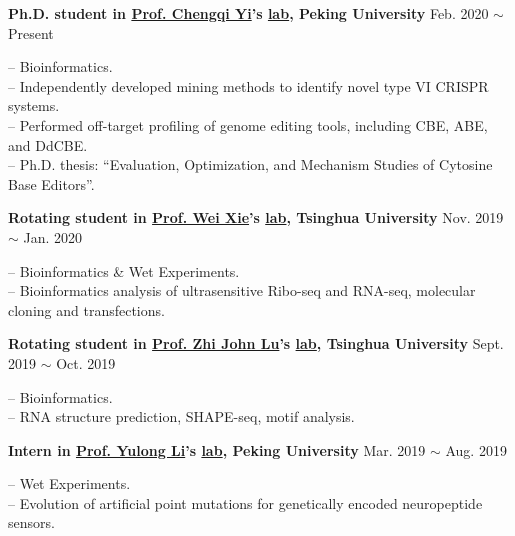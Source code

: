 \textbf{Ph.D. student in \href{https://www.bio.pku.edu.cn/enhomes/news/teacher_dis/91.html}{Prof. Chengqi Yi}'s \href{https://yilab.org.cn/}{lab}, Peking University} \hfill Feb. 2020 $\sim$ Present

{\small
-- Bioinformatics.\\
-- Independently developed mining methods to identify novel type VI CRISPR systems.\\
-- Performed off-target profiling of genome editing tools, including CBE, ABE, and DdCBE\cite{lei2022mitochondrial,rao2023characterizing,lei2021detect,lei2023detect}.\\
-- Ph.D. thesis: ``Evaluation, Optimization, and Mechanism Studies of Cytosine Base Editors''.
}

\vspace{5pt}

\textbf{Rotating student in \href{https://life.tsinghua.edu.cn/lifeen/info/1034/1077.htm}{Prof. Wei Xie}'s \href{http://www.xielab.org.cn/}{lab}, Tsinghua University} \hfill Nov. 2019 $\sim$ Jan. 2020

{\small
-- Bioinformatics \& Wet Experiments.\\
-- Bioinformatics analysis of ultrasensitive Ribo-seq and RNA-seq, molecular cloning and transfections.
}

\vspace{5pt}

\textbf{Rotating student in \href{https://life.tsinghua.edu.cn/lifeen/info/1034/1083.htm}{Prof. Zhi John Lu}'s \href{https://lulab.life.tsinghua.edu.cn/labhome/home/}{lab}, Tsinghua University} \hfill Sept. 2019 $\sim$ Oct. 2019

{\small
-- Bioinformatics. \\
-- RNA structure prediction\cite{zhu2021integrative}, SHAPE-seq, motif analysis.
}


\vspace{5pt}


\textbf{Intern in \href{https://www.bio.pku.edu.cn/enhomes/news/teacher_dis/43.html}{Prof. Yulong Li}'s \href{http://www.yulonglilab.org/}{lab}, Peking University} \hfill Mar. 2019 $\sim$ Aug. 2019

{\small
-- Wet Experiments. \\
-- Evolution of artificial point mutations for genetically encoded neuropeptide sensors.
}


\vspace{5pt}


